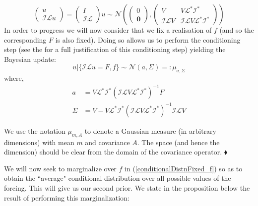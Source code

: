 \begin{equation}
    \label{jointInfoDist}
    \begin{pmatrix}
    u \\
    \mathcal{I}\mathcal{L}u
    \end{pmatrix} =
    \begin{pmatrix}
    I \\ \mathcal{I}\mathcal{L}
    \end{pmatrix} u \sim \mathcal{N}\left(
    \begin{pmatrix}
    0 \\
    \mathbf{0}
    \end{pmatrix},
    \begin{pmatrix}
    V & V\mathcal{L}^{*}\mathcal{I}^{*} \\
    \mathcal{I}\mathcal{L}V & \mathcal{I}\mathcal{L}V\mathcal{L}^{*}\mathcal{I}^{*}
    \end{pmatrix}
    \right)
\end{equation}
In order to progress we will now consider that we fix a realisation of $f$ (and so the corresponding $F$ is also fixed). Doing so allows us to perform the conditioning step (see the \textcolor{blue}{} for a full justification of this conditioning step) yielding the Bayesian update:
\begin{equation}
    \label{conditionalDistnFixed_f}
    u|\{\mathcal{I}\mathcal{L}u=F,f\}\sim\mathcal{N}(a,\Sigma)=:\mu_{a,\Sigma}
\end{equation}
where,
\begin{align}
    \label{post_mean_before_averaging}
    a &= V\mathcal{L}^{*}\mathcal{I}^{*}(\mathcal{I}\mathcal{L}V\mathcal{L}^{*}\mathcal{I}^{*})^{-1}F \\
    \label{post_var_before_averaging}
    \Sigma &= V - V\mathcal{L}^{*}\mathcal{I}^{*}(\mathcal{I}\mathcal{L}V\mathcal{L}^{*}\mathcal{I}^{*})^{-1}\mathcal{I}\mathcal{L}V
\end{align}
\begin{remark}
We use the notation $\mu_{m,A}$ to denote a Gaussian measure (in arbitrary dimensions) with mean $m$ and covariance $A$. The space (and hence the dimension) should be clear from the domain of the covariance operator.
$\mathbin{\blacklozenge}$
\end{remark}

We will now seek to marginalize over $f$ in (\ref{conditionalDistnFixed_f}) so as to obtain the ``average" conditional distribution over all possible values of the forcing. This will give us our second prior. We state in the proposition below the result of performing this marginalization: \vspace{10pt}

